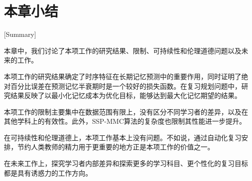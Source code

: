 \section{本章小结}[Summary]

本章中，我们讨论了本项工作的研究结果、限制、可持续性和伦理道德问题以及未来的工作。

本项工作的研究结果确定了时序特征在长期记忆预测中的重要作用，同时证明了绝对百分比误差在预测记忆半衰期时是一个较好的损失函数。在复习规划问题中，研究结果反映了以最小化记忆成本为优化目标，能够达到最大化记忆期望的结果。

本项工作的限制主要集中在数据范围有限上，没有区分不同学习者的差异，以及在其他学科上的有效性。此外，SSP-MMC算法的复杂度也限制其性能进一步提升。

在可持续性和伦理道德上，本项工作基本上没有问题。不如说，通过自动化复习安排，节约人类教师的精力用于更重要的地方正是本项工作的价值之一。

在未来工作上，探究学习者内部差异和探索更多的学习科目、更个性化的复习目标都是具有诱惑力的工作方向。